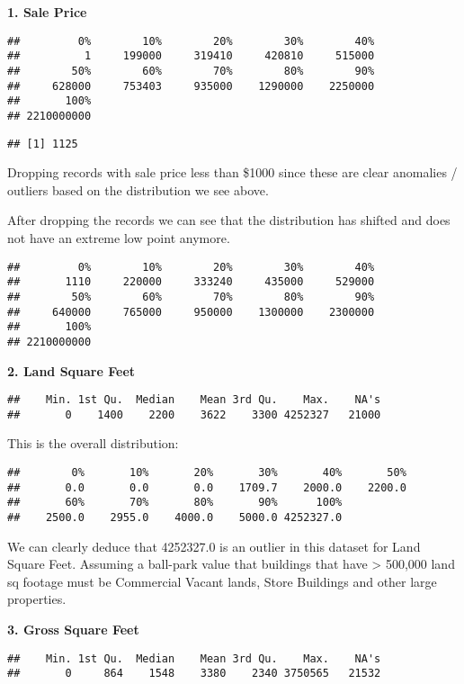 \documentclass[
  a3paper,
]{article}
\begin{document}
\textbf{1. Sale Price}

\begin{verbatim}
##         0%        10%        20%        30%        40% 
##          1     199000     319410     420810     515000 
##        50%        60%        70%        80%        90% 
##     628000     753403     935000    1290000    2250000 
##       100% 
## 2210000000
\end{verbatim}

\begin{verbatim}
## [1] 1125
\end{verbatim}

Dropping records with sale price less than \$1000 since these are clear
anomalies / outliers based on the distribution we see above.

After dropping the records we can see that the distribution has shifted
and does not have an extreme low point anymore.

\begin{verbatim}
##         0%        10%        20%        30%        40% 
##       1110     220000     333240     435000     529000 
##        50%        60%        70%        80%        90% 
##     640000     765000     950000    1300000    2300000 
##       100% 
## 2210000000
\end{verbatim}

\textbf{2. Land Square Feet}

\begin{verbatim}
##    Min. 1st Qu.  Median    Mean 3rd Qu.    Max.    NA's 
##       0    1400    2200    3622    3300 4252327   21000
\end{verbatim}

This is the overall distribution:

\begin{verbatim}
##        0%       10%       20%       30%       40%       50% 
##       0.0       0.0       0.0    1709.7    2000.0    2200.0 
##       60%       70%       80%       90%      100% 
##    2500.0    2955.0    4000.0    5000.0 4252327.0
\end{verbatim}

We can clearly deduce that 4252327.0 is an outlier in this dataset for
Land Square Feet. Assuming a ball-park value that buildings that have
\textgreater{} 500,000 land sq footage must be Commercial Vacant lands,
Store Buildings and other large properties.

\textbf{3. Gross Square Feet}

\begin{verbatim}
##    Min. 1st Qu.  Median    Mean 3rd Qu.    Max.    NA's 
##       0     864    1548    3380    2340 3750565   21532
\end{verbatim}
\end{document}
